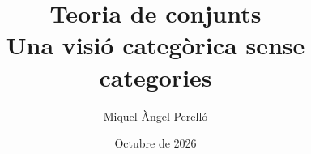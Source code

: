 \newcommand{\llibretitol}{Teoria de conjunts}
\newcommand{\llibresubtitol}{Una visió categòrica sense categories}
\newcommand{\llibreautor}{Miquel Àngel Perelló}
\newcommand{\llibreversio}{1.7.1}
\newcommand{\llibredata}{Octubre de 2026}
\newcommand{\llibreany}{2026}
\newcommand{\llibreweb}{\url{https://aprendes.com/logcat/}}
\newcommand{\llibrerepositori}{\url{https://github.com/maperello/aprendes}}
\newcommand{\llibreerrates}{\url{https://github.com/maperello/aprendes/issues}}

\title{\llibretitol\\[0.8em]\large\llibresubtitol}
\author{\llibreautor}
\date{\llibredata}

\newcommand{\hypermetadata}{%
  \hypersetup{%
    pdftitle={\llibretitol: \llibresubtitol},
    pdfauthor={\llibreautor},
    pdfsubject={Teoria estructural de conjunts (ETCS) exposada en un llenguatge de primer ordre sobre aplicacions, sense pressuposar la teoria de categories: parts, construccions universals, exponencials, nombres naturals, cardinalitat, bons ordres, ordinals i cardinals. Versió \llibreversio\ (\llibredata). Llicència CC BY-SA 4.0},
    pdfkeywords={teoria de conjunts, ETCS, conjunts estructurals, Lawvere, topos ben apuntat, axioma d'elecció, ordinals, cardinals, hipòtesi del continu},
    bookmarksnumbered=true,
    bookmarksopen=true%
  }%
}
